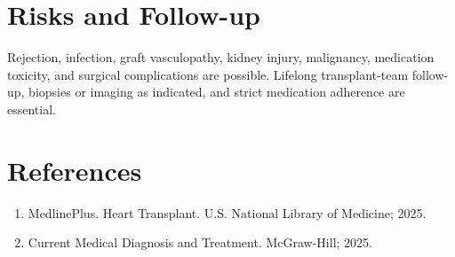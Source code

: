 \section*{Risks and Follow-up}
Rejection, infection, graft vasculopathy, kidney injury, malignancy, medication toxicity, and surgical complications are possible. Lifelong transplant-team follow-up, biopsies or imaging as indicated, and strict medication adherence are essential.

\section*{References}
\begin{enumerate}
  \item MedlinePlus. Heart Transplant. U.S. National Library of Medicine; 2025.
  \item Current Medical Diagnosis and Treatment. McGraw-Hill; 2025.
\end{enumerate}
\clearpage
